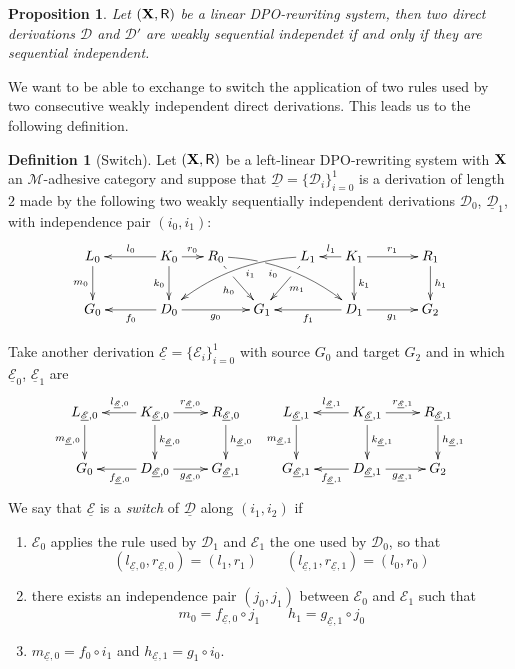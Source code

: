 \documentclass[a4paper]{article}
\def\R{\mathsf{R}}
\def\X{\textbf {\textup{X}}}
\newcommand{\dder}[1]{\mathscr{#1}}
\newcommand{\der}[1]{\underline{\dder{#1}}}
\newtheorem{proposition}[theorem]{Proposition}
\theoremstyle{definition}
\newtheorem{definition}[theorem]{Definition}
\begin{document}
	\begin{proposition}\label{rem:weak}
	Let $(\X, \R)$ be a linear DPO-rewriting system, then two direct derivations $\dder{D}$ and $\dder{D}'$ are weakly sequential independet if and only if they are sequential independent. 
\end{proposition}


We want to be able to exchange to switch the application of two rules used by two consecutive weakly independent direct derivations. This leads us to the following definition.

\begin{definition}[Switch]
  \label{de:switch}
 Let $(\X, \R)$ be a left-linear DPO-rewriting system with $\X$ an $\mathcal{M}$-adhesive category and suppose that $\der{D}=\{\dder{D}_i\}_{i=0}^1$  is a derivation of length $2$ made by the following two weakly sequentially independent derivations $\dder{D}_0$, $\der{D}_1$, with independence pair $(i_0, i_1)$:
 	\[\xymatrix@C=15pt{L_0 \ar[d]_{m_0}&& K_0 \ar[d]_{k_0}\ar[ll]_{l_0} \ar[r]^{r_0} & R_0 \ar@/^.35cm/[drrr]|(.3)\hole_(.4){i_0} \ar[dr]|(.3)\hole_{h_0} && L_1 \ar@/_.35cm/[dlll]^(.4){i_1} \ar[dl]|(.3)\hole^{m_1}& K_1 \ar[d]^{k_1}\ar[l]_{l_1} \ar[rr]^{r_1} && R_1 \ar[d]^{h_1}\\G_0 && \ar[ll]^{f_0} D_0 \ar[rr]_{g_0}&& G_1  && \ar[ll]^{f_1} D_1 \ar[rr]_{g_1}&& G_2}\]
 	
 	Take another derivation $\der{E}=\{\dder{E}_i\}_{i=0}^1$ with source $G_0$ and target $G_2$ and in which $\der{E}_0$, $\der{E}_1$ are
\[\xymatrix{L_{\der{E},0} \ar[d]_{m_{\der{E},0}}& K_{\der{E},0} \ar[d]^{k_{\der{E},0}}\ar[l]_{l_{\der{E},0}} \ar[r]^{r_{\der{E},0}} & R_{\der{E},0} \ar[d]^{h_{\der{E},0}} & L_{\der{E},1} \ar[d]_{m_{\der{E},1}}& K_{\der{E},1} \ar[d]^{k_{\der{E},1}}\ar[l]_{l_{\der{E},1}} \ar[r]^{r_{\der{E},1}} & R_{\der{E},1} \ar[d]^{h_{\der{E},1}}\\G_{0} & \ar[l]^{f_{\der{E},0}} D_{\der{E},0} \ar[r]_{g_{\der{E},0}}& G_{\der{E},1} & G_{\der{E},1} & \ar[l]^{f_{\der{E},1}} D_{\der{E},1} \ar[r]_{g_{\der{E},1}}& G_{2}}\]
 	We say that $\der{E}$ is a
 	 	 \emph{switch} of $\der{D}$ along $(i_1, i_2)$ if
 	\begin{enumerate}
 		\item $\dder{E}_0$ applies the rule used by $\dder{D}_1$ and $\dder{E}_1$ the one used by $\dder{D}_0$, so that
 		\[(l_{\der{E},0}, r_{\der{E},0})=(l_1,r_1)  \qquad (l_{\der{E},1}, r_{\der{E},1})=(l_0,r_0)\]
 		\item there exists an independence pair $(j_0, j_1)$ between $\dder{E}_0$ and $\dder{E}_1$ such that
 		\[ m_0=f_{\der{E},0} \circ j_1 \qquad h_1=g_{\der{E},1} \circ j_0\]
 		\item $m_{\der{E},0}= f_0\circ i_1$ and $h_{\der{E},1}= g_{1}\circ i_0$.
 	\end{enumerate}
\end{definition}
\end{document}
